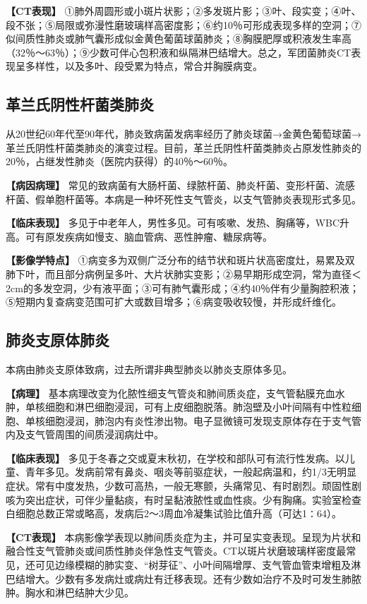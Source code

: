 \textbf{【CT表现】}
①肺外周圆形或小斑片状影；②多发斑片影；③叶、段实变；④叶、段不张；⑤局限或弥漫性磨玻璃样高密度影；⑥约10％可形成表现多样的空洞；⑦似间质性肺炎或肺气囊形成似金黄色葡菌球菌肺炎；⑧胸膜肥厚或积液发生率高（32％～63％）；⑨少数可伴心包积液和纵隔淋巴结增大。总之，军团菌肺炎CT表现呈多样性，以及多叶、段受累为特点，常合并胸膜病变。

\subsection{革兰氏阴性杆菌类肺炎}

从20世纪60年代至90年代，肺炎致病菌发病率经历了肺炎球菌→金黄色葡萄球菌→革兰氏阴性杆菌类肺炎的演变过程。目前，革兰氏阴性杆菌类肺炎占原发性肺炎的20％，占继发性肺炎（医院内获得）的40％～60％。

\textbf{【病因病理】}
常见的致病菌有大肠杆菌、绿脓杆菌、肺炎杆菌、变形杆菌、流感杆菌、假单胞杆菌等。本病是一种坏死性支气管炎，以支气管肺炎表现形式多见。

\textbf{【临床表现】}
多见于中老年人，男性多见。可有咳嗽、发热、胸痛等，WBC升高。可有原发疾病如慢支、脑血管病、恶性肿瘤、糖尿病等。

\textbf{【影像学特点】}
①病变多为双侧广泛分布的结节状和斑片状高密度灶，易累及双肺下叶，而且部分病例呈多叶、大片状肺实变影；②易早期形成空洞，常为直径＜2cm的多发空洞，少有液平面；③可有肺气囊形成；④约40％伴有少量胸腔积液；⑤短期内复查病变范围可扩大或数目增多；⑥病变吸收较慢，并形成纤维化。

\subsection{肺炎支原体肺炎}

本病由肺炎支原体致病，过去所谓非典型肺炎以肺炎支原体多见。

\textbf{【病理】}
基本病理改变为化脓性细支气管炎和肺间质炎症，支气管黏膜充血水肿，单核细胞和淋巴细胞浸润，可有上皮细胞脱落。肺泡壁及小叶间隔有中性粒细胞、单核细胞浸润，肺泡内有炎性渗出物。电子显微镜可发现支原体存在于支气管内及支气管周围的间质浸润病灶中。

\textbf{【临床表现】}
多见于冬春之交或夏末秋初，在学校和部队可有流行性发病。以儿童、青年多见。发病前常有鼻炎、咽炎等前驱症状，一般起病温和，约1/3无明显症状。常有中度发热，少数可高热，一般无寒颤，头痛常见、有时剧烈。顽固性剧咳为突出症状，可伴少量黏痰，有时呈黏液脓性或血性痰。少有胸痛。实验室检查白细胞总数正常或略高，发病后2～3周血冷凝集试验比值升高（可达1∶64）。

\textbf{【CT表现】}
本病影像学表现以肺间质炎症为主，并可呈实变表现。呈现为片状和融合性支气管肺炎或间质性肺炎伴急性支气管炎。CT以斑片状磨玻璃样密度最常见，还可见边缘模糊的肺实变、“树芽征”、小叶间隔增厚、支气管血管束增粗及淋巴结增大。少数有多发病灶或病灶有迁移表现。还有少数如治疗不及时可发生肺脓肿。胸水和淋巴结肿大少见。

